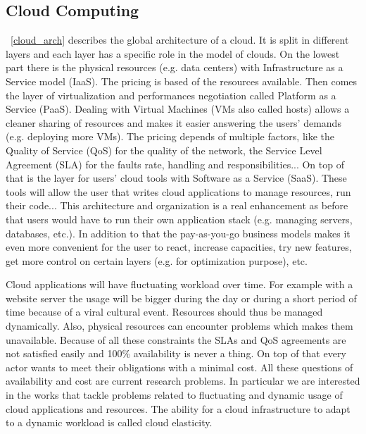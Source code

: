\documentclass[a4paper, onecolumn, 11pt]{article}
\begin{document}
  \subsection{Cloud Computing}
  
  \figurename~\ref{cloud_arch} describes the global architecture of a cloud. It
  is split in different layers and each layer has a specific role in the model
  of clouds. On the lowest part there is the physical resources (e.g. data
  centers) with Infrastructure as a Service model (IaaS). The pricing is based
  of the resources available. Then comes the layer of virtualization and
  performances negotiation called Platform as a Service (PaaS). Dealing with
  Virtual Machines (VMs also called hosts) allows a cleaner sharing of resources
  and makes it easier answering the users' demands (e.g. deploying more VMs).
  The pricing depends of multiple factors, like the Quality of Service (QoS) for
  the quality of the network, the Service Level Agreement (SLA) for the faults
  rate, handling and responsibilities... On top of that is the layer for users'
  cloud tools with Software as a Service (SaaS). These tools will allow the user
  that writes cloud applications to manage resources, run their code... This
  architecture and organization is a real enhancement as before that users would
  have to run their own application stack (e.g. managing servers, databases,
  etc.). In addition to that the pay-as-you-go business models makes it even
  more convenient for the user to react, increase capacities, try new features,
  get more control on certain layers (e.g. for optimization purpose), etc.
  
  Cloud applications will have fluctuating workload over time. For example with
  a website server the usage will be bigger during the day or during a short
  period of time because of a viral cultural event. Resources should thus be
  managed dynamically. Also, physical resources can encounter problems which
  makes them unavailable. Because of all these constraints the SLAs and QoS
  agreements are not satisfied easily and 100\% availability is never a thing.
  On top of that every actor wants to meet their obligations with a minimal
  cost. All these questions of availability and cost are current research
  problems. In particular we are interested in the works that tackle problems
  related to fluctuating and dynamic usage of cloud applications and resources.
  The ability for a cloud infrastructure to adapt to a dynamic workload is
  called cloud elasticity.
  
\end{document}
